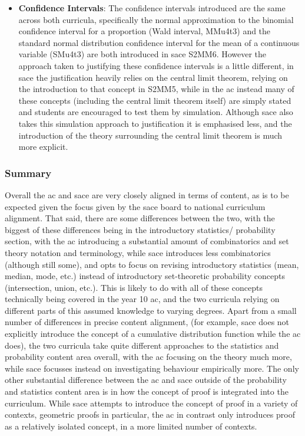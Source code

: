 \documentclass[twoside,12pt,a4paper]{report}
\begin{document}
\begin{itemize}
	\item \textbf{Confidence Intervals}: The confidence intervals introduced are the same across both curricula, specifically the normal approximation to the binomial confidence interval for a proportion (Wald interval, MMu4t3) and the standard normal distribution confidence interval for the mean of a continuous variable (SMu4t3) are both introduced in \gls{sace} S2MM6. However the approach taken to justifying these confidence intervals is a little different, in \gls{sace} the justification heavily relies on the central limit theorem, relying on the introduction to that concept in S2MM5, while in the \gls{ac} instead many of these concepts (including the central limit theorem itself) are simply stated and students are encouraged to test them by simulation. Although \gls{sace} also takes this simulation approach to justification it is emphasised less, and the introduction of the theory surrounding the central limit theorem is much more explicit.
\end{itemize}



\subsubsection{Summary}

Overall the \gls{ac} and \gls{sace} are very closely aligned in terms of content, as is to be expected given the focus given by the \gls{sace} board to national curriculum alignment. That said, there are some differences between the two, with the biggest of these differences being in the introductory statistics/ probability section, with the \gls{ac} introducing a substantial amount of combinatorics and set theory notation and terminology, while \gls{sace} introduces less combinatorics (although still some), and opts to focus on revising introductory statistics (mean, median, mode, etc.) instead of introductory set-theoretic probability concepts (intersection, union, etc.). This is likely to do with all of these concepts technically being covered in the year 10 \gls{ac}, and the two curricula relying on different parts of this assumed knowledge to varying degrees. Apart from a small number of differences in precise content alignment, (for example, \gls{sace} does not explicitly introduce the concept of a cumulative distribution function while the \gls{ac} does), the two curricula take quite different approaches to the statistics and probability content area overall, with the \gls{ac} focusing on the theory much more, while \gls{sace} focusses instead on investigating behaviour empirically more. The only other substantial difference between the \gls{ac} and \gls{sace} outside of the probability and statistics content area is in how the concept of proof is integrated into the curriculum. While \gls{sace} attempts to introduce the concept of proof in a variety of contexts, geometric proofs in particular, the \gls{ac} in contrast only introduces proof as a relatively isolated concept, in a more limited number of contexts.
\end{document}
